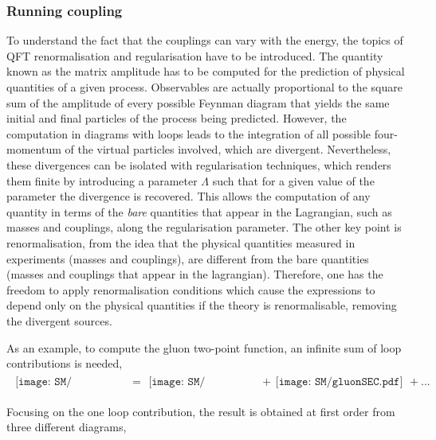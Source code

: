 \subsubsection{Running coupling}

To understand the fact that the couplings can vary with the energy, the topics of \acrshort{QFT} renormalisation and regularisation have to be introduced. The quantity known as the matrix amplitude has to be computed for the prediction of physical quantities of a given process. Observables are actually proportional to the square sum of the amplitude of every possible Feynman diagram that yields the same initial and final particles of the process being predicted. However, the computation in diagrams with loops leads to the integration of all possible four-momentum of the virtual particles involved, which are divergent. Nevertheless, these divergences can be isolated with regularisation techniques, which renders them finite by introducing a parameter $\Lambda$ such that for a given value of the parameter the divergence is recovered. This allows the computation of any quantity in terms of the \textit{bare} quantities that appear in the Lagrangian, such as masses and couplings, along the regularisation parameter. The other key point is renormalisation, from the idea that the physical quantities measured in experiments (masses and couplings), are different from the bare quantities (masses and couplings that appear in the lagrangian). Therefore, one has the freedom to apply renormalisation conditions which cause the expressions to depend only on the physical quantities if the theory is renormalisable, removing the divergent sources.

As an example, to compute the gluon two-point function, an infinite sum of loop contributions is needed,
\begin{align}
\begin{gathered}
    \texttt{[image: SM/gluonSEA.pdf]}
\end{gathered}&=\begin{gathered}\texttt{[image: SM/gluonSEB.pdf]}
\end{gathered}&+\begin{gathered}\texttt{[image: SM/gluonSEC.pdf]}
\end{gathered}+...
\end{align}

Focusing on the one loop contribution, the result is obtained at first order from three different diagrams,



